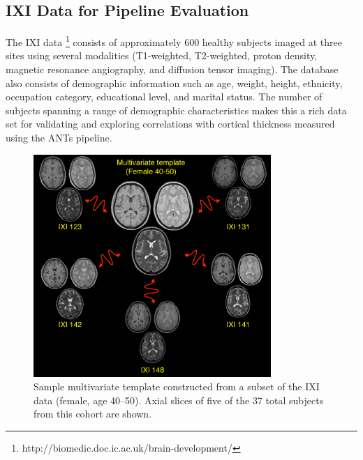 \subsection{IXI Data for Pipeline Evaluation}

The IXI data%
\footnote{
http://biomedic.doc.ic.ac.uk/brain-development/
}
consists of approximately 600 healthy subjects imaged at three sites 
using several modalities (T1-weighted, T2-weighted, proton density, magnetic 
resonance angiography, and diffusion tensor imaging).  The 
database also consists of  demographic information such as age, weight,
height, ethnicity, occupation category, educational level, and marital status.
The number of subjects spanning a range of demographic characteristics makes
this a rich data set for validating and exploring correlations with cortical 
thickness measured using the ANTs pipeline.

\begin{figure}
  \centering
  \includegraphics[width=90mm]{Figures/template.pdf}
  \caption{Sample multivariate template constructed from a subset of the IXI data (female, age 40--50).  Axial slices of five of the 37 total subjects from this cohort are shown. }
  \label{fig:template}
\end{figure}

